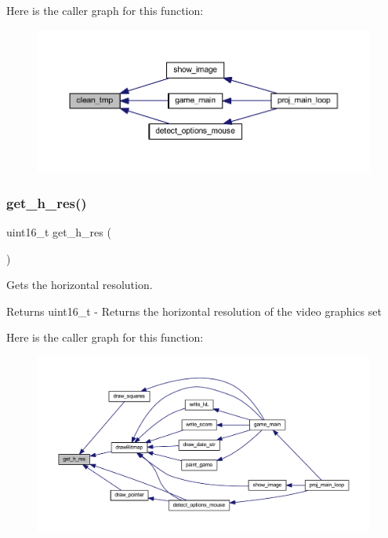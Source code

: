 Here is the caller graph for this function\+:
\nopagebreak
\begin{figure}[H]
\begin{center}
\leavevmode
\includegraphics[width=350pt]{group__videog_ga330b56594412c06fcf7c605709352a19_icgraph}
\end{center}
\end{figure}
\mbox{\label{group__videog_ga53190a84d33dca987a32592d55b0e764}} 
\subsubsection{\texorpdfstring{get\+\_\+h\+\_\+res()}{get\_h\_res()}}
{\footnotesize\ttfamily uint16\+\_\+t get\+\_\+h\+\_\+res (\begin{DoxyParamCaption}{ }\end{DoxyParamCaption})}



Gets the horizontal resolution. 

\begin{DoxyReturn}{Returns}
uint16\+\_\+t -\/ Returns the horizontal resolution of the video graphics set 
\end{DoxyReturn}
Here is the caller graph for this function\+:
\nopagebreak
\begin{figure}[H]
\begin{center}
\leavevmode
\includegraphics[width=350pt]{group__videog_ga53190a84d33dca987a32592d55b0e764_icgraph}
\end{center}
\end{figure}
\mbox{\label{group__videog_ga753e43171fab6674507b8b8042be0906}} 

